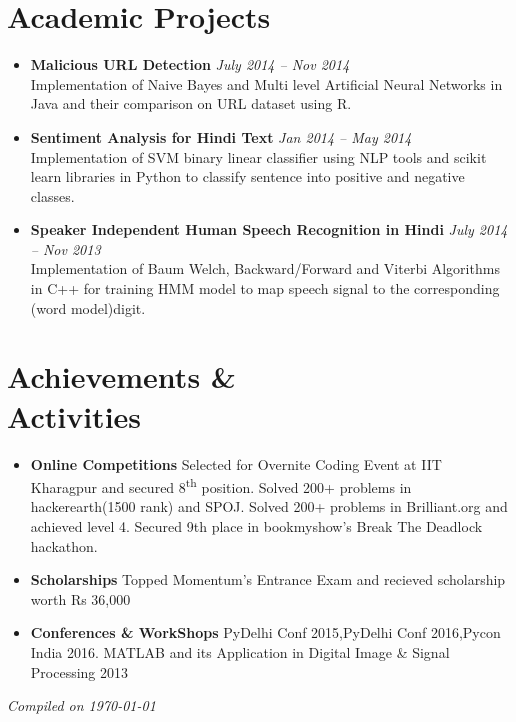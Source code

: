 \documentclass[margin,line]{resume}
\begin{document}
\begin{resume}
    \section{\mysidestyle Academic Projects}
    \vspace{0mm}	
       \begin{itemize}
	        \item \textbf{Malicious URL Detection} \hfill \textsl{July 2014 -- Nov 2014}\\ Implementation of Naive Bayes and Multi level Artificial Neural Networks in Java and their comparison on URL dataset using R.
            \item \textbf{Sentiment Analysis for Hindi Text} \hfill \textsl{Jan 2014 -- May 2014}\\ Implementation of SVM binary linear classifier using NLP tools and scikit learn libraries in Python to classify sentence into positive and negative classes.
            \item \textbf{Speaker Independent Human Speech Recognition in Hindi} \hfill \textsl{July 2014 -- Nov 2013}\\ Implementation of Baum Welch, Backward/Forward and Viterbi Algorithms in C++ for training HMM model to map speech signal to the corresponding (word model)digit.
       \end{itemize}
\section{\mysidestyle Achievements \& \\ Activities}
\vspace{0mm}
    \begin{itemize}
            \item \textbf{Online Competitions} \vspace{0mm}
		        \subitem Selected for Overnite Coding Event at IIT Kharagpur and secured 8​\textsuperscript{th}​ position.
		        \subitem Solved 200+ problems in hackerearth(1500 rank) and SPOJ.
		        \subitem Solved 200+ problems in Brilliant.org and achieved level 4.
		        \subitem Secured 9th place in bookmyshow's Break The Deadlock hackathon.		        
            \item \textbf{Scholarships} \vspace{0mm}
            	\subitem Topped Momentum's Entrance Exam and recieved scholarship worth Rs 36,000
            \item \textbf{Conferences \& WorkShops} \vspace{0mm}
	            \subitem PyDelhi Conf 2015,PyDelhi Conf 2016,Pycon India 2016.
		        \subitem MATLAB and its Application in Digital Image \& Signal Processing 2013
    \end{itemize}
\hfill \textsl{Compiled on \monthyeardate\today}            
%
\end{resume}
\end{document}
